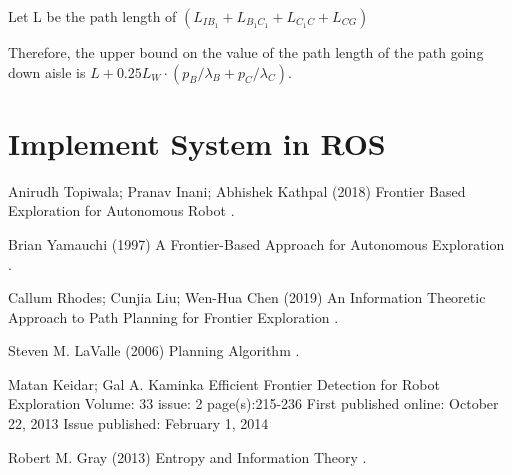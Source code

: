 \documentclass{article}
\begin{document}
Let L be the path length of $(L_{IB_{1}}  
			+ L_{B_{1}C_{1}} + L_{C_{1}C} 
			+ L_{CG} )$
			
Therefore, the upper bound on the value of the path length of the path going down aisle is $L+ 0.25L_{W}\cdot(p_{B} / \lambda_{B}   +  p_{C} / \lambda_{C})$.

\pagebreak
\section{Implement System in ROS}

\pagebreak

  
\begin{thebibliography}{1}


 Anirudh Topiwala; Pranav Inani; Abhishek Kathpal
\newblock (2018)
\newblock Frontier Based Exploration for Autonomous Robot
.

Brian Yamauchi
\newblock (1997)
\newblock  A Frontier-Based Approach for Autonomous Exploration
.

Callum Rhodes; Cunjia Liu; Wen-Hua Chen
\newblock (2019)
\newblock An Information Theoretic Approach to Path Planning for Frontier Exploration
.

Steven M. LaValle
\newblock (2006)
\newblock Planning Algorithm
.

Matan Keidar; Gal A. Kaminka
\newblock Efficient Frontier Detection for Robot Exploration
\newblock Volume: 33 issue: 2
\newblock page(s):215-236
\newblock First published online: October 22, 2013
\newblock Issue published: February 1, 2014

Robert M. Gray
\newblock (2013)
\newblock Entropy and Information Theory
.



\end{thebibliography}


\end{document}
